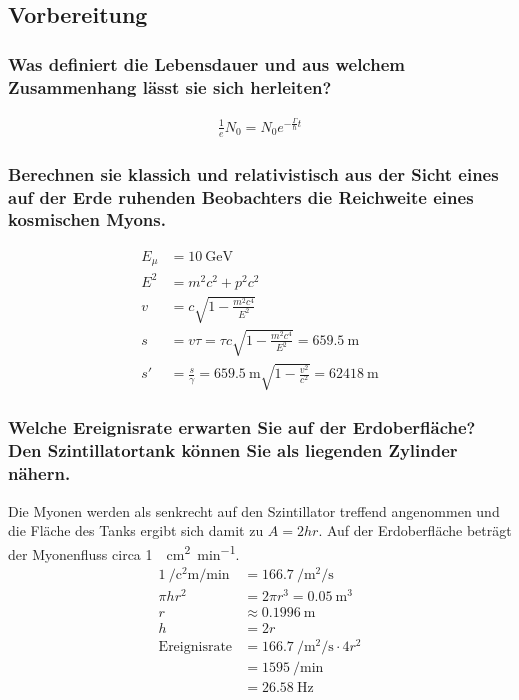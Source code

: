 \subsection{Vorbereitung}
\subsubsection{Was definiert die Lebensdauer und aus welchem Zusammenhang lässt sie sich herleiten?}
\begin{align*}
    \frac{1}{e} N_0 = N_0 e^{-\frac{\Gamma}{\hbar} t}
\end{align*}
\subsubsection{Berechnen sie klassich und relativistisch aus der Sicht eines auf der Erde ruhenden Beobachters die Reichweite eines kosmischen Myons.}
\begin{align*}
    E_{\mu} &= \SI{10}{\giga \electronvolt}\\
    E^2 &= m^2c^2 + p^2c^2 \\
    v &= c\sqrt{1-\frac{m^2 c^4}{E^2}}\\
    s &= v\tau = \tau c \sqrt{1-\frac{m^2 c^4}{E^2}} = \SI{659.5}{\metre}\\
    s\prime &= \frac{s}{\gamma} = \SI{659.5}{\metre} \sqrt{1-\frac{v^2}{c^2}} = \SI{62418}{\metre}
\end{align*}
\subsubsection{Welche Ereignisrate erwarten Sie auf der Erdoberfläche? Den Szintillatortank können Sie als liegenden Zylinder nähern.}
Die Myonen werden als senkrecht auf den Szintillator treffend angenommen und die Fläche des Tanks ergibt sich damit zu $A = 2hr$.
Auf der Erdoberfläche beträgt der Myonenfluss circa \SI{1}{\per \square \centi \metre \per \minute}.
\begin{align*}
    \SI{1}{\per \square \centi \metre \per \minute} &= \SI{166.7}{\per \square \metre \per \second} \\
    \pi h r^2 &= 2\pi r^3 = \SI{0.05}{\cubic \metre} \\
    r &≈ \SI{0.1996}{\meter} \\
    h &= 2r \\
    \text{Ereignisrate} &= \SI{166.7}{\per \square \metre \per \second} \cdot 4r^2 \\
    &= \SI{1595}{\per \minute} \\
    &= \SI{26.58}{\hertz}
\end{align*}